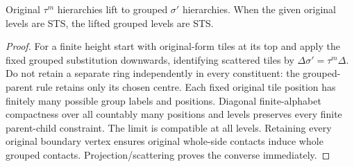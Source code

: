 \begin{lemma}\label{lem:grouping-lift}
Original $\tau^m$ hierarchies lift to grouped $\sigma'$ hierarchies.
When the given original levels are STS, the lifted grouped levels are STS.
\end{lemma}
\begin{proof}
For a finite height start with original-form tiles at its top and apply the
fixed grouped substitution downwards, identifying scattered tiles by
$\Delta\sigma'=\tau^m\Delta$. Do not retain a separate ring independently
in every constituent: the grouped-parent rule retains only its chosen centre.
Each fixed original tile position has finitely many possible group labels
and positions. Diagonal finite-alphabet compactness over all countably many
positions and levels preserves every finite parent-child constraint.
The limit is compatible at all levels. Retaining every original boundary
vertex ensures original whole-side contacts induce whole grouped contacts.
Projection/scattering proves the converse immediately.
\end{proof}

